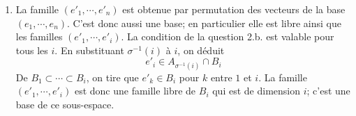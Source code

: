 \begin{enumerate}
\begin{enumerate}
  \item La famille $(e'_1,\cdots,e'_n)$ est obtenue par permutation des vecteurs de la base $(e_1,\cdots,e_n)$. C'est donc aussi une base; en particulier elle est libre ainsi que les familles $(e'_1, \cdots, e'_i)$.\newline
  La condition de la question 2.b. est valable pour tous les $i$. En substituant $\sigma^{-1}(i)$ à $i$, on déduit
\begin{displaymath}
  e'_i\in A_{\sigma^{-1}(i)} \cap B_i
\end{displaymath}
De $B_1\subset \cdots \subset B_i$, on tire que $e'_k \in B_i$ pour $k$ entre $1$ et $i$. La famille $(e'_1,\cdots, e'_i)$ est donc une famille libre de $B_i$ qui est de dimension $i$; c'est une base de ce sous-espace. 
\end{enumerate}


\end{enumerate}

